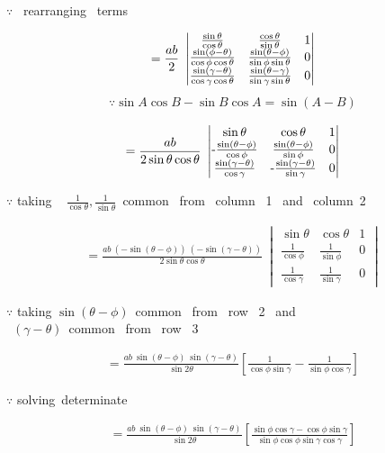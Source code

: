 \documentclass[journal,12pt,twocolumn]{IEEEtran}
\begin{document}
$\because$ ~rearranging ~terms 


\begin{multline}
=\frac{ab}{2}~\begin{vmatrix}
 \frac{\sin\theta}{\cos\theta} & \frac{\cos\theta}{\sin\theta} & 1  \\ 
 \frac{\sin(\phi-\theta)}{\cos\phi\cos\theta} & \frac{\sin(\theta-\phi)}{\sin\phi\sin\theta} & 0  \\
 \frac{\sin(\gamma-\theta)}{\cos\gamma\cos\theta} & \frac{\sin(\theta-\gamma)}{\sin\gamma\sin\theta} & 0 
\end{vmatrix}    
\end{multline}
\begin{align*}
\because \sin A\cos B - \sin B\cos A = \sin(A-B)
\end{align*}

\begin{multline}
=\frac{ab}{2 \sin\theta\cos\theta}~\mydet{
 {\sin\theta} & {\cos\theta} & 1  \\ $-$
 \frac{\sin(\theta-\phi)}{\cos\phi} & \frac{\sin(\theta-\phi)}{\sin\phi} & 0  \\
 \frac{\sin(\gamma-\theta)}{\cos\gamma} &$-$ \frac{\sin(\gamma-\theta)}{\sin\gamma} & 0 
}
\end{multline}

$\because$ taking ~ $\frac{1}{\cos\theta},\frac{1}{\sin\theta}$~common ~from ~column~ 1 ~and~ column~2 


\begin{multline}
=\frac{ab~(-\sin(\theta-\phi))~(-\sin(\gamma-\theta))}{2 \sin\theta\cos\theta}~\begin{vmatrix}
 {\sin\theta} & {\cos\theta} & 1  \\ 
 \frac{1}{\cos\phi} & \frac{1}{\sin\phi} & 0  \\
 \frac{1}{\cos\gamma} & \frac{1}{\sin\gamma} & 0 
\end{vmatrix}    
\end{multline}

$\because$ taking $\sin(\theta-\phi)$~common ~from ~row ~2
~and\\~\sin$(\gamma-\theta)$~common ~from ~row ~3



\begin{multline}
=\frac{ab~\sin(\theta-\phi)~\sin(\gamma-\theta)}{ \sin2\theta}\left[\frac{1}{\cos\phi\sin\gamma}-\frac{1}{\sin\phi\cos\gamma}
\right]
\end{multline}

$\because$ solving~determinate 


\begin{multline}
=\frac{ab~\sin(\theta-\phi)~\sin(\gamma-\theta)}{ \sin2\theta}\left[\frac{\sin\phi\cos\gamma-\cos\phi\sin\gamma}{\sin\phi\cos\phi\sin\gamma\cos\gamma}
\right]
\end{multline}
\end{document}
